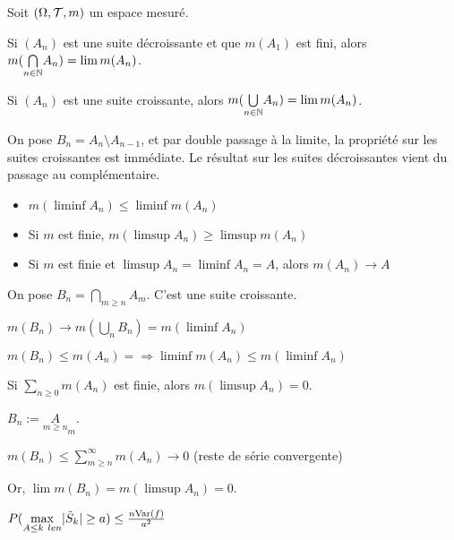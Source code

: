 \documentclass[10pt,a4paper,notitlepage ]{report}
\begin{document}
\begin{propriete}
	Soit $(\Omega, \mathcal T, m)$ un espace mesuré.
	
	Si $(A_n)$ est une suite décroissante et que $m(A_1)$ est fini, alors $m(\underset {n\in\mathbb N} \bigcap A_n) = \lim m(A_n)$.
	
	Si $(A_n)$ est une suite croissante, alors $m(\underset {n\in\mathbb N} \bigcup A_n) = \lim m(A_n)$.
\end{propriete}

\begin{demo}
	On pose $B_n = A_n \setminus A_{n-1}$, et par double passage à la limite, la propriété sur les suites croissantes est immédiate. Le résultat sur les suites décroissantes vient du passage au complémentaire.
\end{demo}

\begin{lemme}
	\begin{itemize}
		\item $m(\liminf A_n) \le \liminf m(A_n)$
		\item Si $m$ est finie, $m(\limsup A_n) \ge \limsup m(A_n)$
		\item Si $m$ est finie et $\limsup A_n = \liminf A_n = A$, alors $m(A_n) \rightarrow A$
	\end{itemize}
\end{lemme}

\begin{demo}
	On pose $B_n = \underset {m \ge n} \bigcap A_m$. C'est une suite croissante.
	
	$m(B_n) \rightarrow m(\underset n \bigcup B_n) = m(\liminf A_n)$
	
	$m(B_n) \le m(A_n)= \Rightarrow \liminf m(A_n) \le m(\liminf A_n)$
\end{demo}

\begin{lemme}
	Si $\underset {n\ge 0} \sum m(A_n)$ est finie, alors $m(\limsup A_n) = 0$.
\end{lemme}

\begin{demo}
	$B_n := \underset {m\ge n} A_m$.
	
	$m(B_n) \le \sum_{m \ge n}^\infty m(A_n) \rightarrow 0$ (reste de série convergente)
	
	Or, $\lim m(B_n) = m(\limsup A_n) = 0$.
\end{demo}

\begin{theorem}
	$P( \underset {A \le k \ le n} \max |\tilde S_k| \ge a) \le \frac {n \mathrm{Var}(f)} {a^2}$
\end{theorem}
\end{document}
